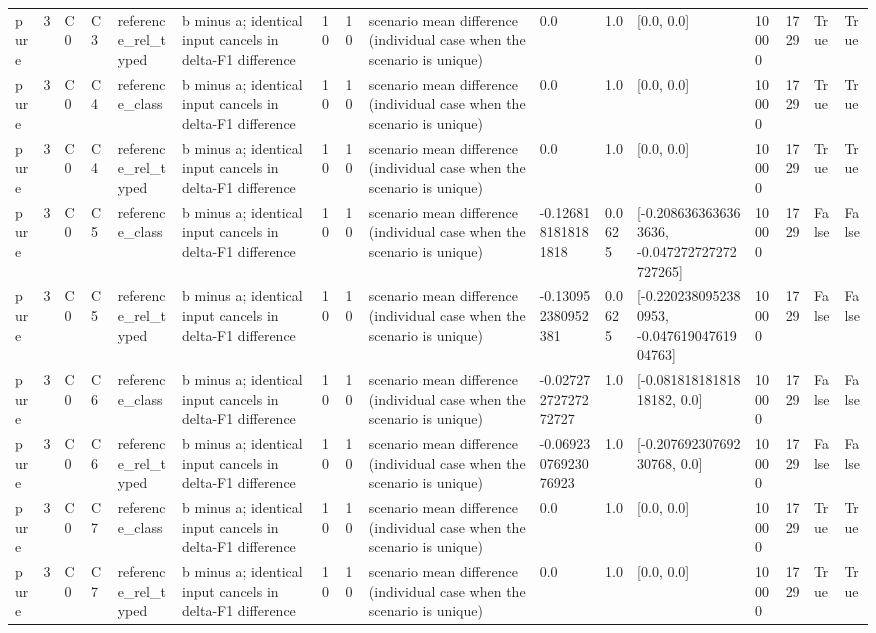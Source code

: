 \begin{tabular}{llllllllllllllll}
pure & 3 & C0 & C3 & reference\_rel\_typed & b minus a; identical input cancels in delta-F1 difference & 10 & 10 & scenario mean difference (individual case when the scenario is unique) & 0.0 & 1.0 & [0.0, 0.0] & 10000 & 1729 & True & True \\
pure & 3 & C0 & C4 & reference\_class & b minus a; identical input cancels in delta-F1 difference & 10 & 10 & scenario mean difference (individual case when the scenario is unique) & 0.0 & 1.0 & [0.0, 0.0] & 10000 & 1729 & True & True \\
pure & 3 & C0 & C4 & reference\_rel\_typed & b minus a; identical input cancels in delta-F1 difference & 10 & 10 & scenario mean difference (individual case when the scenario is unique) & 0.0 & 1.0 & [0.0, 0.0] & 10000 & 1729 & True & True \\
pure & 3 & C0 & C5 & reference\_class & b minus a; identical input cancels in delta-F1 difference & 10 & 10 & scenario mean difference (individual case when the scenario is unique) & -0.1268181818181818 & 0.0625 & [-0.2086363636363636, -0.047272727272727265] & 10000 & 1729 & False & False \\
pure & 3 & C0 & C5 & reference\_rel\_typed & b minus a; identical input cancels in delta-F1 difference & 10 & 10 & scenario mean difference (individual case when the scenario is unique) & -0.130952380952381 & 0.0625 & [-0.2202380952380953, -0.04761904761904763] & 10000 & 1729 & False & False \\
pure & 3 & C0 & C6 & reference\_class & b minus a; identical input cancels in delta-F1 difference & 10 & 10 & scenario mean difference (individual case when the scenario is unique) & -0.02727272727272727 & 1.0 & [-0.08181818181818182, 0.0] & 10000 & 1729 & False & False \\
pure & 3 & C0 & C6 & reference\_rel\_typed & b minus a; identical input cancels in delta-F1 difference & 10 & 10 & scenario mean difference (individual case when the scenario is unique) & -0.06923076923076923 & 1.0 & [-0.20769230769230768, 0.0] & 10000 & 1729 & False & False \\
pure & 3 & C0 & C7 & reference\_class & b minus a; identical input cancels in delta-F1 difference & 10 & 10 & scenario mean difference (individual case when the scenario is unique) & 0.0 & 1.0 & [0.0, 0.0] & 10000 & 1729 & True & True \\
pure & 3 & C0 & C7 & reference\_rel\_typed & b minus a; identical input cancels in delta-F1 difference & 10 & 10 & scenario mean difference (individual case when the scenario is unique) & 0.0 & 1.0 & [0.0, 0.0] & 10000 & 1729 & True & True \\

\end{tabular}
